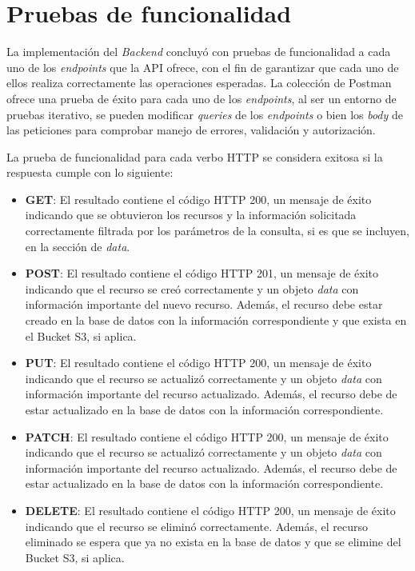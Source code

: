 \section{Pruebas de funcionalidad}
La implementación del \textit{Backend} concluyó con pruebas de funcionalidad a cada uno de los
\textit{endpoints} que la API ofrece, con el fin de garantizar que cada uno de ellos realiza correctamente
las operaciones esperadas.
La colección de Postman ofrece una prueba de éxito para cada uno de los \textit{endpoints}, al ser
un entorno de pruebas iterativo, se pueden modificar \textit{queries} de los \textit{endpoints} o bien
los \textit{body} de las peticiones para comprobar manejo de errores, validación y autorización.

La prueba de funcionalidad para cada verbo HTTP se considera exitosa si la respuesta cumple con lo siguiente:
\begin{itemize}
    \item \textbf{GET}: El resultado contiene el código HTTP 200, un mensaje de éxito indicando que se obtuvieron
        los recursos y la información solicitada correctamente filtrada por los parámetros de la consulta,
        si es que se incluyen, en la sección de \textit{data}.
    \item \textbf{POST}: El resultado contiene el código HTTP 201, un mensaje de éxito indicando que el
        recurso se creó correctamente y un objeto \textit{data} con información importante del nuevo recurso.
        Además, el recurso debe estar creado en la base de datos con la información correspondiente y que exista en el Bucket S3, si aplica.
    \item \textbf{PUT}: El resultado contiene el código HTTP 200, un mensaje de éxito indicando que el recurso
        se actualizó correctamente y un objeto \textit{data} con información importante del recurso actualizado.
        Además, el recurso debe de estar actualizado en la base de datos con la información correspondiente.
    \item \textbf{PATCH}: El resultado contiene el código HTTP 200, un mensaje de éxito indicando que el recurso
        se actualizó correctamente y un objeto \textit{data} con información importante del recurso actualizado.
        Además, el recurso debe de estar actualizado en la base de datos con la información correspondiente.
    \item \textbf{DELETE}: El resultado contiene el código HTTP 200, un mensaje de éxito indicando que el recurso
        se eliminó correctamente. Además, el recurso eliminado se espera que ya no exista en la base de datos
        y que se elimine del Bucket S3, si aplica.
\end{itemize}

